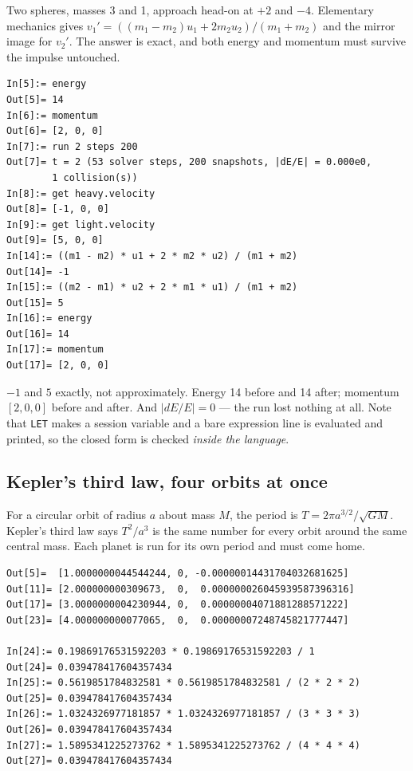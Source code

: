 \documentclass[11pt]{article}
\newcommand{\kw}[1]{\texttt{\uppercase{#1}}}
\begin{document}
Two spheres, masses 3 and 1, approach head-on at $+2$ and $-4$.
Elementary mechanics gives
$v_1' = ((m_1-m_2)u_1 + 2m_2u_2)/(m_1+m_2)$ and the mirror image for
$v_2'$. The answer is exact, and both energy and momentum must survive
the impulse untouched.

\begin{lstlisting}
In[5]:= energy
Out[5]= 14
In[6]:= momentum
Out[6]= [2, 0, 0]
In[7]:= run 2 steps 200
Out[7]= t = 2 (53 solver steps, 200 snapshots, |dE/E| = 0.000e0,
        1 collision(s))
In[8]:= get heavy.velocity
Out[8]= [-1, 0, 0]
In[9]:= get light.velocity
Out[9]= [5, 0, 0]
In[14]:= ((m1 - m2) * u1 + 2 * m2 * u2) / (m1 + m2)
Out[14]= -1
In[15]:= ((m2 - m1) * u2 + 2 * m1 * u1) / (m1 + m2)
Out[15]= 5
In[16]:= energy
Out[16]= 14
In[17]:= momentum
Out[17]= [2, 0, 0]
\end{lstlisting}

$-1$ and $5$ exactly, not approximately. Energy 14 before and 14 after;
momentum $[2,0,0]$ before and after. And $|dE/E| = 0$ --- the run lost
nothing at all. Note that \kw{let} makes a session variable and a bare
expression line is evaluated and printed, so the closed form is checked
\emph{inside the language}.

\subsection{Kepler's third law, four orbits at once}

For a circular orbit of radius $a$ about mass $M$, the period is
$T = 2\pi a^{3/2}/\sqrt{GM}$. Kepler's third law says $T^2/a^3$ is the
same number for every orbit around the same central mass. Each planet
is run for its own period and must come home.

\begin{lstlisting}
Out[5]=  [1.0000000044544244, 0, -0.00000014431704032681625]
Out[11]= [2.000000000309673,  0,  0.000000026045939587396316]
Out[17]= [3.0000000004230944, 0,  0.00000004071881288571222]
Out[23]= [4.000000000077065,  0,  0.00000007248745821777447]

In[24]:= 0.19869176531592203 * 0.19869176531592203 / 1
Out[24]= 0.039478417604357434
In[25]:= 0.5619851784832581 * 0.5619851784832581 / (2 * 2 * 2)
Out[25]= 0.039478417604357434
In[26]:= 1.0324326977181857 * 1.0324326977181857 / (3 * 3 * 3)
Out[26]= 0.039478417604357434
In[27]:= 1.5895341225273762 * 1.5895341225273762 / (4 * 4 * 4)
Out[27]= 0.039478417604357434
\end{lstlisting}
\end{document}
